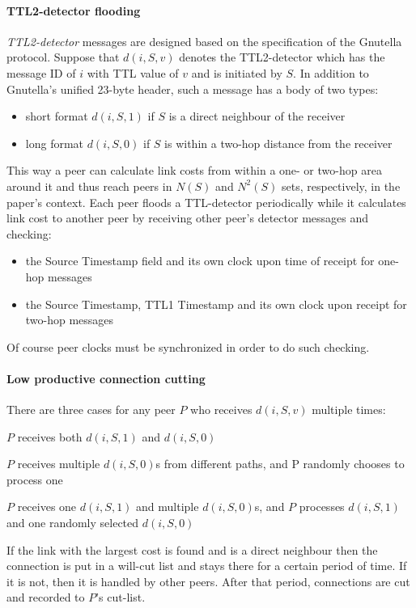 \documentclass[a4paper,10pt]{article}
\begin{document}
\paragraph*{TTL2-detector flooding}
\emph{TTL2-detector} messages are designed based on the specification of the Gnutella protocol. Suppose that $d(i, S, v)$ denotes the TTL2-detector which has the message ID of $i$ with TTL value of $v$ and is initiated by $S$. In addition to Gnutella's unified 23-byte header, such a message has a body of two types:
\begin{itemize}
  \item short format $d(i, S, 1)$ if $S$ is a direct neighbour of the receiver
  \item long format $d(i, S, 0)$ if $S$ is within a two-hop distance from the receiver
\end{itemize}
This way a peer can calculate link costs from within a one- or two-hop area around it and thus reach peers in $N(S)$ and $N^2(S)$ sets, respectively, in the paper's context. Each peer floods a TTL-detector periodically while it calculates link cost to another peer by receiving other peer's detector messages and checking:
\begin{itemize}
  \item the Source Timestamp field and its own clock upon time of receipt for one-hop messages
  \item the Source Timestamp, TTL1 Timestamp and its own clock upon receipt for two-hop messages
\end{itemize}
Of course peer clocks must be synchronized in order to do such checking.

\paragraph*{Low productive connection cutting}
There are three cases for any peer $P$ who receives $d(i, S, v)$ multiple times:
\begin{inparaenum}
  \item $P$ receives both $d(i, S, 1)$ and $d(i, S, 0)$
  \item $P$ receives multiple $d(i, S, 0)$s from different paths, and P randomly chooses to process one
  \item $P$ receives one $d(i, S, 1)$ and multiple $d(i, S, 0)$s, and $P$ processes $d(i, S, 1)$ and one randomly selected $d(i, S, 0)$
\end{inparaenum}
If the link with the largest cost is found and is a direct neighbour then the connection is put in a will-cut list and stays there for a certain period of time. If it is not, then it is handled by other peers. After that period, connections are cut and recorded to $P$'s cut-list.
\end{document}
